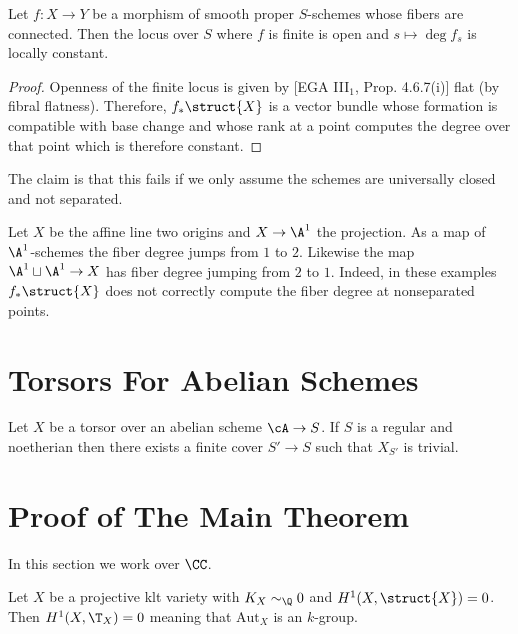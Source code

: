 \documentclass[12pt]{article}
\begin{document}
\begin{prop}
Let $f : X \to Y$ be a morphism of smooth proper $S$-schemes whose fibers are connected. Then the locus over $S$ where $f$ is finite is open and $s \mapsto \deg{f_s}$ is locally constant.
\end{prop}

\begin{proof}
Openness of the finite locus is given by [EGA III$_1$, Prop. 4.6.7(i)] flat (by fibral flatness). Therefore, $f_* \struct{X}$ is a vector bundle whose formation is compatible with base change and whose rank at a point computes the degree over that point which is therefore constant. 
\end{proof}

The claim is that this fails if we only assume the schemes are universally closed and not separated. 

\begin{example}
Let $X$ be the affine line two origins and $X \to \A^1$ the projection. As a map of $\A^1$-schemes the fiber degree jumps from $1$ to $2$. Likewise the map $\A^1 \sqcup \A^1 \to X$ has fiber degree jumping from $2$ to $1$. Indeed, in these examples $f_* \struct{X}$ does not correctly compute the fiber degree at nonseparated points. 
\end{example}

\section{Torsors For Abelian Schemes}

\begin{theorem}
Let $X$ be a torsor over an abelian scheme $\cA \to S$. If $S$ is a regular and noetherian then there exists a finite \etale cover $S' \to S$ such that $X_{S'}$ is trivial.
\end{theorem}



\section{Proof of The Main Theorem}

In this section we work over $\CC$.

\begin{prop} \label{prop:inf_auts}
Let $X$ be a projective klt variety with $K_X \sim_{\Q} 0$ and $H^1(X, \struct{X}) = 0$. Then $H^1(X, \T_X) = 0$ meaning that $\mathrm{Aut}_X$ is an \etale $k$-group.
\end{prop}
\end{document}
